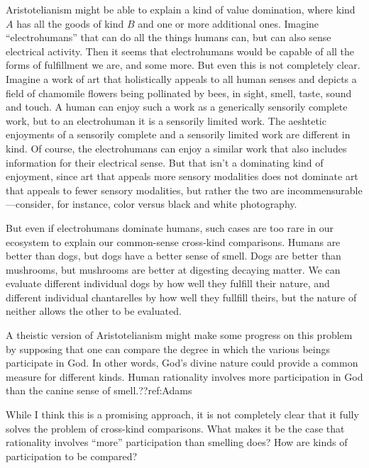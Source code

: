 Aristotelianism might be able to explain a kind of value domination, where kind $A$ has all the goods of kind
$B$ and one or more additional ones. Imagine ``electrohumans'' that can do all the things humans can, but can also sense
electrical activity. Then it seems that electrohumans would be capable of all the forms of fulfillment we are, and 
some more. But even this is not completely clear. Imagine a work of art that holistically appeals to all
human senses and depicts a field of chamomile flowers being pollinated by bees, in sight, smell, taste, sound and touch.
A human can enjoy such a work as a generically sensorily complete work, but to an electrohuman it is a sensorily limited 
work. The aeshtetic enjoyments of a sensorily complete and a sensorily limited work are different in kind. Of course, 
the electrohumans can enjoy a similar work that also includes information for their electrical sense. But that isn't 
a dominating kind of enjoyment, since art that appeals more sensory modalities does not dominate art that appeals to 
fewer sensory modalities, but rather the two are incommensurable---consider, for instance, color versus black and white
photography. 

But even if electrohumans dominate humans, such cases are too rare in our ecosystem to explain our common-sense 
cross-kind comparisons. Humans are better than dogs, but dogs have a better sense of smell. Dogs are better than mushrooms,
but mushrooms are better at digesting decaying matter. We can evaluate different individual dogs by how well they 
fulfill their nature, and different individual chantarelles by how well they fullfill theirs, but the nature of neither
allows the other to be evaluated.

A theistic version of Aristotelianism might make some progress on this problem by supposing that one can
compare the degree in which the various beings participate in God. In other words, God's divine nature could 
provide a common measure for different kinds. Human rationality involves more participation in God than the canine 
sense of smell.??ref:Adams

While I think this is a promising approach, it is not completely clear that it fully solves the problem of cross-kind 
comparisons. What makes it be the case that rationality involves ``more'' participation than smelling does? How are 
kinds of participation to be compared? 


